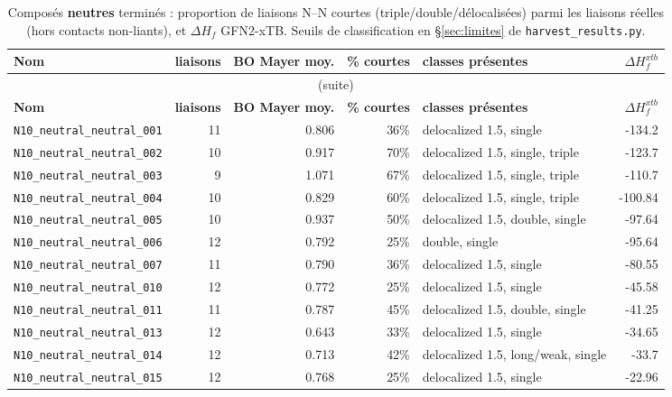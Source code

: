 {\scriptsize
\begin{longtable}{@{}p{4.6cm}rrrp{2.4cm}r@{}}
\caption{Compos\'es \textbf{neutres} termin\'es : proportion de liaisons N--N courtes (triple/double/d\'elocalis\'ees) parmi les liaisons r\'eelles (hors contacts non-liants), et $\Delta H_f$ GFN2-xTB. Seuils de classification en \S\ref{sec:limites} de \texttt{harvest\_results.py}.}
\label{tab:bonds-dhf}\\
\toprule
\textbf{Nom} & \textbf{liaisons} & \textbf{BO Mayer moy.} & \textbf{\% courtes\footnotemark[1]} & \textbf{classes pr\'esentes} & \textbf{$\Delta H_f^{xtb}$} \\
\midrule\endfirsthead
\multicolumn{6}{c}{\small (suite)}\\ \toprule
\textbf{Nom} & \textbf{liaisons} & \textbf{BO Mayer moy.} & \textbf{\% courtes} & \textbf{classes pr\'esentes} & \textbf{$\Delta H_f^{xtb}$} \\
\midrule\endhead
\bottomrule\endfoot
\bottomrule\endlastfoot
\texttt{N10\_neutral\_neutral\_001} & 11 & 0.806 & 36\% & delocalized 1.5, single & -134.2 \\
\texttt{N10\_neutral\_neutral\_002} & 10 & 0.917 & 70\% & delocalized 1.5, single, triple & -123.7 \\
\texttt{N10\_neutral\_neutral\_003} & 9 & 1.071 & 67\% & delocalized 1.5, single, triple & -110.7 \\
\texttt{N10\_neutral\_neutral\_004} & 10 & 0.829 & 60\% & delocalized 1.5, single, triple & -100.84 \\
\texttt{N10\_neutral\_neutral\_005} & 10 & 0.937 & 50\% & delocalized 1.5, double, single & -97.64 \\
\texttt{N10\_neutral\_neutral\_006} & 12 & 0.792 & 25\% & double, single & -95.64 \\
\texttt{N10\_neutral\_neutral\_007} & 11 & 0.790 & 36\% & delocalized 1.5, single & -80.55 \\
\texttt{N10\_neutral\_neutral\_010} & 12 & 0.772 & 25\% & delocalized 1.5, single & -45.58 \\
\texttt{N10\_neutral\_neutral\_011} & 11 & 0.787 & 45\% & delocalized 1.5, double, single & -41.25 \\
\texttt{N10\_neutral\_neutral\_013} & 12 & 0.643 & 33\% & delocalized 1.5, single & -34.65 \\
\texttt{N10\_neutral\_neutral\_014} & 12 & 0.713 & 42\% & delocalized 1.5, long/weak, single & -33.7 \\
\texttt{N10\_neutral\_neutral\_015} & 12 & 0.768 & 25\% & delocalized 1.5, single & -22.96 \\

\end{longtable}}
